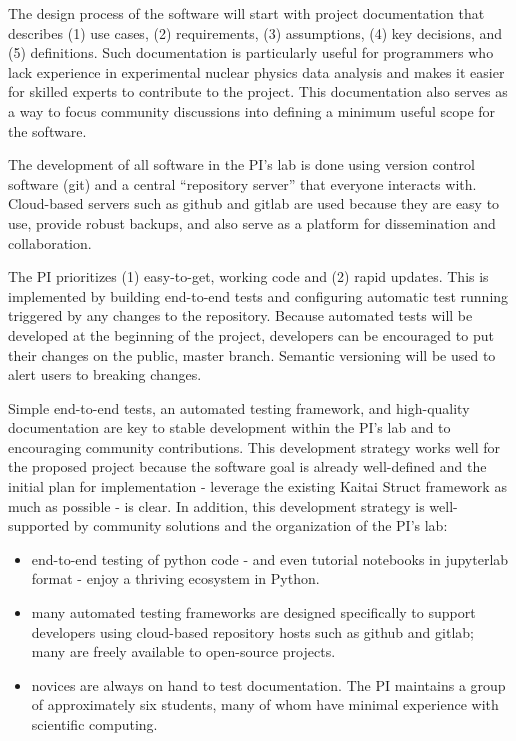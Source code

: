 The design process of the software will start with project documentation that describes (1) use cases, (2) requirements, (3) assumptions, (4) key decisions, and (5) definitions.  Such documentation is particularly useful for programmers who lack experience in experimental nuclear physics data analysis and makes it easier for skilled experts to contribute to the project.  This documentation also serves as a way to focus community discussions into defining a minimum useful scope for the software.

The development of all software in the PI's lab is done using version control software (git) and a central ``repository server'' that everyone interacts with.  Cloud-based servers such as github and gitlab are used because they are easy to use, provide robust backups, and also serve as a platform for dissemination and collaboration.

The PI prioritizes (1) easy-to-get, working code and (2) rapid updates.  This is implemented by building end-to-end tests and configuring automatic test running triggered by any changes to the repository.  Because automated tests will be developed at the beginning of the project, developers can be encouraged to put their changes on the public, master branch.  Semantic versioning will be used to alert users to breaking changes.


Simple end-to-end tests,  an automated testing framework, and high-quality documentation are key to stable development within the PI's lab and to encouraging community contributions.  This development strategy works well for the proposed project because the software goal is already well-defined and the initial plan for implementation - leverage the existing Kaitai Struct framework as much as possible - is clear.  In addition, this development strategy is well-supported by community solutions and the organization of the PI's lab:

\begin{itemize}
    \item end-to-end testing of python code - and even tutorial notebooks in jupyterlab format - enjoy a thriving ecosystem in Python.
    \item many automated testing frameworks are designed specifically to support developers using cloud-based repository hosts such as github and gitlab; many are freely available to open-source projects.
    \item novices are always on hand to test documentation.  The PI maintains a group of approximately six students, many of whom have minimal experience with scientific computing.
\end{itemize}

